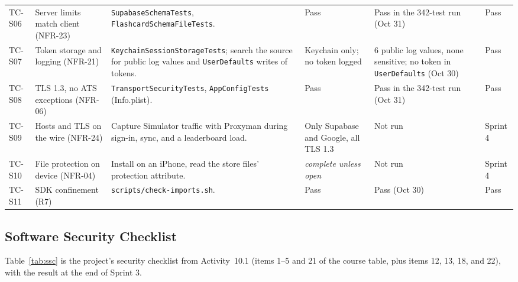 \documentclass[12pt,letterpaper]{article}
\begin{document}
\begin{xltabular}{\textwidth}{@{}L{1.2cm} L{2.4cm} Y L{2.4cm} L{2.4cm} L{1.5cm}@{}}
TC-S06 & Server limits match client (NFR-23) & \texttt{SupabaseSchemaTests}, \texttt{FlashcardSchemaFileTests}. & Pass & Pass in the 342-test run (Oct 31) & Pass \\
TC-S07 & Token storage and logging (NFR-21) & \texttt{KeychainSessionStorageTests}; search the source for public log values and \texttt{UserDefaults} writes of tokens. & Keychain only; no token logged & 6 public log values, none sensitive; no token in \texttt{UserDefaults} (Oct 30) & Pass \\
TC-S08 & TLS 1.3, no ATS exceptions (NFR-06) & \texttt{TransportSecurityTests}, \texttt{AppConfigTests} (Info.plist). & Pass & Pass in the 342-test run (Oct 31) & Pass \\
TC-S09 & Hosts and TLS on the wire (NFR-24) & Capture Simulator traffic with Proxyman during sign-in, sync, and a leaderboard load. & Only Supabase and Google, all TLS 1.3 & Not run & Sprint 4 \\
TC-S10 & File protection on device (NFR-04) & Install on an iPhone, read the store files' protection attribute. & \emph{complete unless open} & Not run & Sprint 4 \\
TC-S11 & SDK confinement (R7) & \texttt{scripts/check-imports.sh}. & Pass & Pass (Oct 30) & Pass \\
\end{xltabular}

\subsection{Software Security Checklist}
Table~\ref{tab:ssc} is the project's security checklist from Activity~10.1 (items 1--5
and 21 of the course table, plus items 12, 13, 18, and 22), with the result at the end
of Sprint 3.
\end{document}
